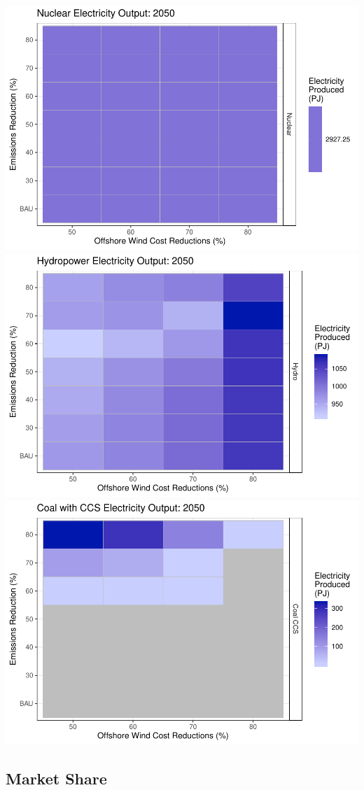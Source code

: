 \documentclass[]{article}
\begin{document}
\includegraphics[width=0.5\linewidth]{osw_Report_files/figure-latex/unnamed-chunk-50-6}
\includegraphics[width=0.5\linewidth]{osw_Report_files/figure-latex/unnamed-chunk-50-7}
\includegraphics[width=0.5\linewidth]{osw_Report_files/figure-latex/unnamed-chunk-50-8}

\hypertarget{market-share}{%
\subsection{Market Share}\label{market-share}}
\end{document}
